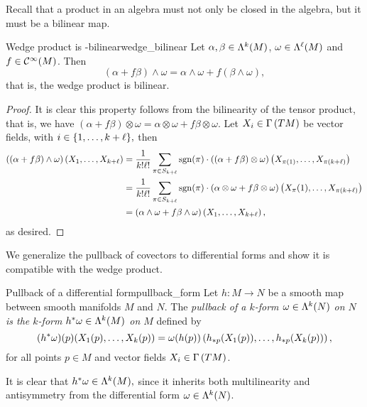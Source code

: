 Recall that a product in an algebra must not only be closed in the algebra, but it must be a bilinear map.
\begin{proposition}{Wedge product is -bilinear}{wedge_bilinear}
    Let \(\alpha,\beta \in \forms[k]{M}\), \(\omega\in \forms[\ell]{M}\) and \(f \in \smooth{M}\). Then
    \begin{equation*}
        (\alpha + f \beta) \wedge \omega = \alpha \wedge \omega + f (\beta\wedge\omega),
    \end{equation*}
    that is, the wedge product is bilinear.
\end{proposition}
\begin{proof}
    It is clear this property follows from the bilinearity of the tensor product, that is, we have \((\alpha + f \beta) \otimes \omega = \alpha \otimes \omega + f \beta \otimes \omega\). Let \(X_i \in \sections{TM}\) be vector fields, with \(i \in \set{1, \dots, k+\ell},\) then
    \begin{align*}
        \left((\alpha + f \beta) \wedge \omega\right)\left(X_1, \dots, X_{k+\ell}\right) &= \frac{1}{k!\ell!} \sum_{\pi \in S_{k+\ell}} \sgn(\pi)\cdot \left((\alpha + f \beta) \otimes \omega\right)\left(X_{\pi(1)}, \dots, X_{\pi(k+\ell)}\right)\\
                                                                                         &= \frac{1}{k!\ell!} \sum_{\pi \in S_{k+\ell}} \sgn(\pi)\cdot (\alpha \otimes \omega + f \beta \otimes \omega)\left(X_\pi(1), \dots, X_{\pi(k+\ell)}\right)\\
                                                                                         &= (\alpha \wedge \omega + f \beta \wedge \omega)\left(X_1, \dots, X_{k+\ell}\right),
    \end{align*}
    as desired.
\end{proof}

We generalize the pullback of covectors to differential forms and show it is compatible with the wedge product.

\begin{definition}{Pullback of a differential form}{pullback_form}
    Let \(h : M \to N\) be a smooth map between smooth manifolds \(M\) and \(N\). The \emph{pullback of a \(k\)-form \(\omega \in \forms[k]{N}\) on \(N\) is the \(k\)-form \(\pb{h}\omega \in \forms[k]{M}\) on \(M\)} defined by
    \begin{equation*}
        (\pb{h}\omega)(p) (X_1(p), \dots, X_k(p)) = \omega(h(p))\left(\pf[p]{h}(X_1(p)), \dots, \pf[p]{h}(X_k(p))\right),
    \end{equation*}
    for all points \(p \in M\) and vector fields \(X_i \in \sections{TM}\).
\end{definition}
It is clear that \(\pb{h}\omega \in \forms[k]{M},\) since it inherits both multilinearity and antisymmetry from the differential form \(\omega \in \forms[k]{N}\).

